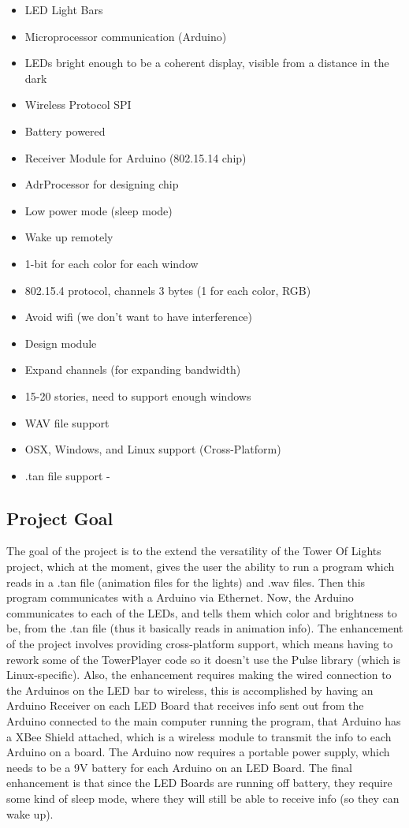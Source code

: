 \documentclass[12pt]{article}
\begin{document}
		\begin{itemize}
			\item LED Light Bars
			\item Microprocessor communication (Arduino)
			\item LEDs bright enough to be a coherent display, visible from a distance in the dark
			\item Wireless Protocol SPI
			\item Battery powered
			\item Receiver Module for Arduino (802.15.14 chip) 
			\item AdrProcessor for designing chip
			\item Low power mode (sleep mode)
			\item Wake up remotely
			\item 1-bit for each color for each window
			\item 802.15.4 protocol, channels 3 bytes (1 for each color, RGB)
			\item Avoid wifi (we don't want to have interference)
			\item Design module
			\item Expand channels (for expanding bandwidth)
			\item 15-20 stories, need to support enough windows
			\item WAV file support
			\item OSX, Windows, and Linux support (Cross-Platform)
			\item .tan file support - 
		\end{itemize}
	
	\subsection{Project Goal}
	The goal of the project is to the extend the versatility of the Tower Of Lights project, which at the moment, gives the user the ability to run a program which reads in a .tan file (animation files for the lights) and .wav files. Then this
	program communicates with a Arduino via Ethernet. Now, the Arduino communicates to each of the LEDs, and tells them which
	color and brightness to be, from the .tan file (thus it basically reads in animation info). 
	The enhancement of the project involves providing cross-platform support, which means having to rework some of the TowerPlayer code so it doesn't use the Pulse library (which is Linux-specific). Also, the enhancement requires making the wired connection to the Arduinos on the LED bar to wireless, this is accomplished by having an Arduino Receiver on each LED Board that receives info sent out from the Arduino connected to the main computer running the program, that Arduino has a XBee Shield attached, which is a wireless module to transmit the info to each Arduino on a board. The Arduino now requires a portable power supply, which needs to be a 9V battery for each Arduino on an LED Board. The final enhancement is that since the LED Boards are running off battery, they require some kind of sleep mode, where they will still be able to receive info (so they can wake up).\\
	
\end{document}
